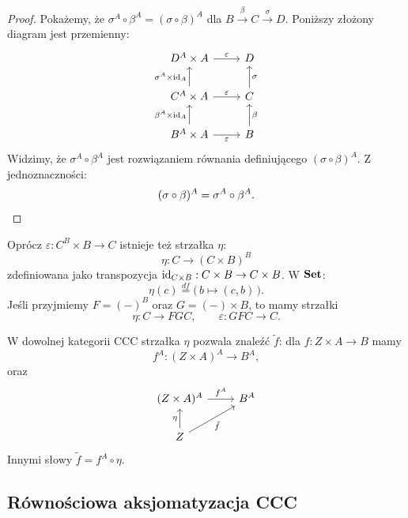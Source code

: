\begin{proof}
Pokażemy, że $\sigma^A \circ \beta^A = (\sigma \circ \beta)^A$ dla $B \xrightarrow{\beta} C \xrightarrow{\sigma} D$. Poniższy złożony diagram jest przemienny:
\[
\begin{tikzcd}
D^A \times A \arrow[r, "\varepsilon"] & D \\
C^A \times A \arrow[u, "\sigma^A \times \id_A"] \arrow[r, "\varepsilon"] & C \arrow[u, "\sigma"'] \\
B^A \times A \arrow[u, "\beta^A \times \id_A"] \arrow[r, "\varepsilon"'] & B \arrow[u, "\beta"']
\end{tikzcd}
\]
Widzimy, że $\sigma^A \circ \beta^A$ jest rozwiązaniem równania definiującego $(\sigma \circ \beta)^A$. Z jednoznaczności:
\[
(\sigma \circ \beta)^A = \sigma^A \circ \beta^A. \qedhere
\]
\end{proof}

\begin{uwaga}
Oprócz $\varepsilon : C^B \times B \to C$ istnieje też strzałka $\eta$:
\[
\eta : C \longrightarrow (C \times B)^B
\]
zdefiniowana jako transpozycja $\mathrm{id}_{C \times B} : C \times B \to C \times B$. W $\mathbf{Set}$:
\[
\eta(c) \stackrel{df}{=} \bigl(\, b \longmapsto (c, b) \,\bigr).
\]
Jeśli przyjmiemy $F = (-)^B$ oraz $G = (-) \times B$, to mamy strzałki
\[
\eta : C \longrightarrow F G C, \qquad \varepsilon : G F C \longrightarrow C.
\]
\end{uwaga}

\begin{uwaga}
W dowolnej kategorii CCC strzałka $\eta$ pozwala znaleźć $\tilde{f}$: dla $f : Z \times A \to B$ mamy
\[
f^A : (Z \times A)^A \longrightarrow B^A,
\]
oraz
\[
\begin{tikzcd}
(Z \times A)^A \arrow[r, "f^A"] & B^A \\
Z \arrow[u, "\eta"] \arrow[ur, "\tilde{f}"'] &
\end{tikzcd}
\]
Innymi słowy $\tilde{f} = f^A \circ \eta$.
\end{uwaga}

\subsection*{Równościowa aksjomatyzacja CCC}

